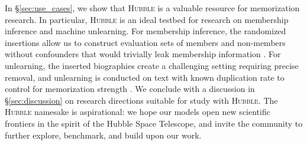 In \S\ref{sec:use_cases}, we show that \textsc{Hubble} is a valuable resource for memorization research. In particular, \textsc{Hubble} is an ideal testbed for research on membership inference and machine unlearning. For membership inference, the randomized insertions allow us to construct evaluation sets of members and non-members without confounders that would trivially leak membership information \citep{duan2024membershipinferenceattackswork}. For unlearning, the inserted biographies create a challenging setting requiring precise removal, and unlearning is conducted on text with known duplication rate to control for memorization strength \citep{krishnan2025dataunlearnedequally}. We conclude with a discussion in \S\ref{sec:discussion} on research directions suitable for study with \textsc{Hubble}. The \textsc{Hubble} namesake is aspirational: we hope our models open new scientific frontiers in the spirit of the Hubble Space Telescope, and invite the community to further explore, benchmark, and build upon our work.






